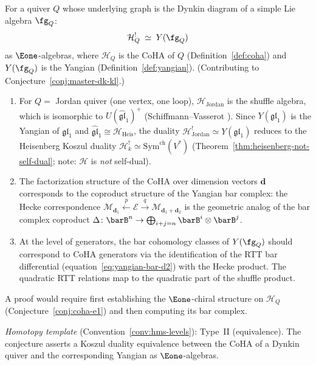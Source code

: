\begin{conjecture}
\label{conj:coha-koszul}
For a quiver $Q$ whose underlying graph is the Dynkin diagram of a
simple Lie algebra $\fg_Q$:
\begin{equation}\label{eq:coha-yangian-dual}
\mathcal{H}_Q^! \;\simeq\; Y(\fg_Q)
\end{equation}
as $\Eone$-algebras, where $\mathcal{H}_Q$ is the CoHA of $Q$
\textup{(}Definition~\textup{\ref{def:coha})} and $Y(\fg_Q)$ is the
Yangian \textup{(}Definition~\textup{\ref{def:yangian})}.
(Contributing to Conjecture~\ref{conj:master-dk-kl}.)
\end{conjecture}

\begin{remark}
\begin{enumerate}[label=(\roman*)]
\item For $Q = $ Jordan quiver (one vertex, one loop),
$\mathcal{H}_{\mathrm{Jordan}}$ is the shuffle algebra, which
is isomorphic to $U(\widehat{\mathfrak{gl}}_1)^+$
(Schiffmann--Vasserot \cite{SV13}).  Since $Y(\mathfrak{gl}_1)$
is the Yangian of $\mathfrak{gl}_1$ and
$\widehat{\mathfrak{gl}}_1 \cong \mathcal{H}_{\mathrm{Heis}}$,
the duality $\mathcal{H}_{\mathrm{Jordan}}^! \simeq Y(\mathfrak{gl}_1)$
reduces to the Heisenberg Koszul duality
$\mathcal{H}_k^! \simeq \mathrm{Sym}^{\mathrm{ch}}(V^*)$
(Theorem~\ref{thm:heisenberg-not-self-dual}; note:
$\mathcal{H}$ is \emph{not} self-dual).
\item The factorization structure of the CoHA over dimension vectors
$\mathbf{d}$ corresponds to the coproduct structure of the Yangian bar
complex: the Hecke correspondence $\mathcal{M}_{\mathbf{d}_1}
\xleftarrow{p} \mathcal{E} \xrightarrow{q}
\mathcal{M}_{\mathbf{d}_1 + \mathbf{d}_2}$ is the geometric analog
of the bar complex coproduct $\Delta\colon \barB^n \to
\bigoplus_{i+j=n} \barB^i \otimes \barB^j$.
\item At the level of generators, the bar cohomology classes of
$Y(\fg_Q)$ should correspond to CoHA generators via the identification
of the RTT bar differential (equation~\eqref{eq:yangian-bar-d2}) with
the Hecke product.  The quadratic RTT relations map to the quadratic
part of the shuffle product.
\end{enumerate}
A proof would require first establishing the $\Eone$-chiral structure
on $\mathcal{H}_Q$ (Conjecture~\ref{conj:coha-e1}) and then computing
its bar complex.

\emph{Homotopy template} (Convention~\ref{conv:hms-levels}): Type~II (equivalence).
The conjecture asserts a Koszul duality equivalence between the CoHA of a Dynkin quiver and the corresponding Yangian as $\Eone$-algebras.
\end{remark}


